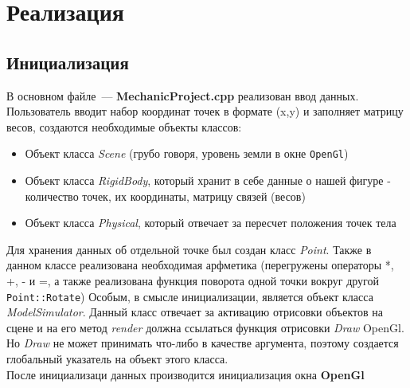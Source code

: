 \section{Реализация}
\subsection{Инициализация}
В основном файле~--- \textbf{MechanicProject.cpp} реализован ввод данных. Пользователь вводит набор координат точек в формате (x,y) и заполняет матрицу весов, создаются необходимые объекты классов:
\begin{itemize}
    \item Объект класса \textit{Scene} (грубо говоря, уровень земли в окне \texttt{OpenGl})
    \item Объект класса \textit{RigidBody}, который хранит в себе данные о нашей фигуре - количество точек, их координаты, матрицу связей (весов)
    \item Объект класса \textit{Physical},  который отвечает за пересчет положения точек тела
\end{itemize}
Для хранения данных об отдельной точке был создан класс \textit{Point}. Также в данном классе реализована необходимая арфметика (перегружены операторы *, +, - и =, а также реализована функция поворота одной точки вокруг другой \texttt{Point::Rotate})
Особым, в смысле инициализации, является объект класса \textit{ModelSimulator}. Данный класс отвечает за активацию отрисовки объектов на сцене и на его метод \textit{render} должна ссылаться функция отрисовки \textit{Draw} OpenGl. Но \textit{Draw} не может принимать что-либо в качестве аргумента, поэтому создается глобальный указатель на объект этого класса.
\\После инициализаци данных производится инициализация окна \textbf{OpenGl}
